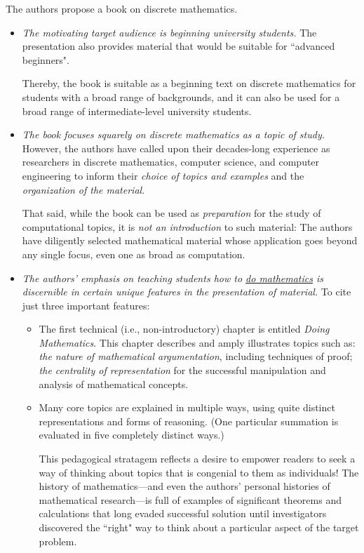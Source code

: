 \documentclass{article}[12pt]
\begin{document}
\noindent
The authors propose a book on discrete mathematics.
\begin{itemize}
\item
{\em The motivating target audience is beginning university students.}  The presentation also provides material that would be suitable for ``advanced beginners".

\smallskip

Thereby, the book is suitable as a beginning text on discrete mathematics for students with a broad range of backgrounds, and it can also be used for a broad range of intermediate-level university students.

\item
{\em The book focuses squarely on discrete mathematics as a topic of study.}  However, the authors have called upon their decades-long experience as researchers in discrete mathematics, computer science, and computer engineering to inform their {\em choice of topics and examples} and the {\em organization of the material}.

\smallskip

That said, while the book can be used as {\em preparation} for the study of computational topics, it is {\em not an introduction} to such material: The authors have diligently selected mathematical material whose application goes beyond any single focus, even one as broad as computation.

\item
{\em The authors' emphasis on teaching students how to \underline{do mathematics} is discernible in certain unique features in the presentation of material.}  To cite just three important features: 
  \begin{itemize}
  \item
The first technical (i.e., non-introductory) chapter is entitled {\em Doing Mathematics}.  This chapter describes and amply illustrates topics such as: {\em the nature of mathematical argumentation}, including techniques of proof; {\em the centrality of representation} for the successful manipulation and analysis of mathematical concepts.

  \item
Many core topics are explained in multiple ways, using quite distinct representations and forms of reasoning.  (One particular summation is evaluated in five completely distinct ways.)

\smallskip

This pedagogical stratagem reflects a desire to empower readers to seek a way of thinking about topics that is congenial to them as individuals!  The history of mathematics---and even the  authors' personal histories of mathematical research---is full of examples of significant theorems and calculations that long evaded successful solution until investigators discovered the ``right" way to think about a particular aspect of the target problem.


\end{itemize}
\end{itemize}
\end{document}
